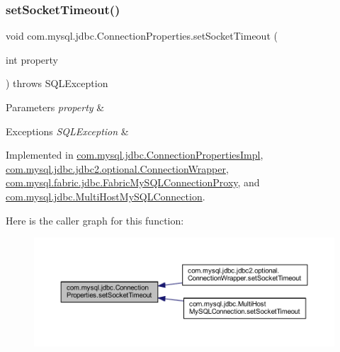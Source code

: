 \subsubsection{\texorpdfstring{set\+Socket\+Timeout()}{setSocketTimeout()}}
{\footnotesize\ttfamily void com.\+mysql.\+jdbc.\+Connection\+Properties.\+set\+Socket\+Timeout (\begin{DoxyParamCaption}\item[{int}]{property }\end{DoxyParamCaption}) throws S\+Q\+L\+Exception}


\begin{DoxyParams}{Parameters}
{\em property} & \\
\hline
\end{DoxyParams}

\begin{DoxyExceptions}{Exceptions}
{\em S\+Q\+L\+Exception} & \\
\hline
\end{DoxyExceptions}


Implemented in \mbox{\hyperlink{classcom_1_1mysql_1_1jdbc_1_1_connection_properties_impl_a6637b8eae4c2a599f7a5925e812fa4df}{com.\+mysql.\+jdbc.\+Connection\+Properties\+Impl}}, \mbox{\hyperlink{classcom_1_1mysql_1_1jdbc_1_1jdbc2_1_1optional_1_1_connection_wrapper_a9714df2e97bd14e45f7f7a93ba7f4673}{com.\+mysql.\+jdbc.\+jdbc2.\+optional.\+Connection\+Wrapper}}, \mbox{\hyperlink{classcom_1_1mysql_1_1fabric_1_1jdbc_1_1_fabric_my_s_q_l_connection_proxy_a3adf8253c38d35f50c666180f0377c4b}{com.\+mysql.\+fabric.\+jdbc.\+Fabric\+My\+S\+Q\+L\+Connection\+Proxy}}, and \mbox{\hyperlink{classcom_1_1mysql_1_1jdbc_1_1_multi_host_my_s_q_l_connection_ab71cfc835c4fb153654b63f887c41df0}{com.\+mysql.\+jdbc.\+Multi\+Host\+My\+S\+Q\+L\+Connection}}.

Here is the caller graph for this function\+:\nopagebreak
\begin{figure}[H]
\begin{center}
\leavevmode
\includegraphics[width=350pt]{interfacecom_1_1mysql_1_1jdbc_1_1_connection_properties_a9c60457be4c5136f4c9a46d849b4a5b9_icgraph}
\end{center}
\end{figure}
\mbox{\label{interfacecom_1_1mysql_1_1jdbc_1_1_connection_properties_afbb6b6808923b1d248ce45db64bafb28}} 
